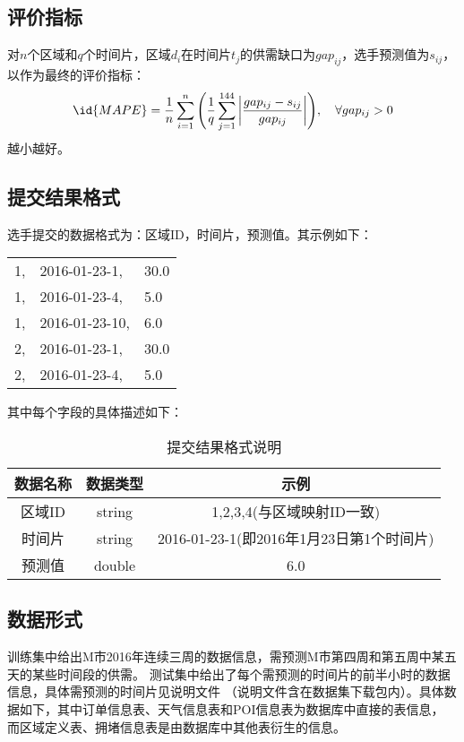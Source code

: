 \documentclass[hyperref,UTF8]{ctexart}
\theoremstyle{definition}
\theoremstyle{remark}
\numberwithin{equation}{subsection}
\begin{document}
	
\subsection{评价指标}
\label{subsec:evaluate_indicator}

	对$n$个区域和$q$个时间片，区域$d_i$在时间片$t_j$的供需缺口为$gap_{ij}$，选手预测值为$s_{ij}$，
以作为最终的评价指标：
\[
	\id{MAPE} = \frac{1}{n} \sum_{i=1}^{n}{\Bigg( \frac{1}{q}\sum_{j=1}^{144}\bigg| \frac{gap_{ij} - s_{ij}}{gap_{ij}} \bigg| \Bigg)},\quad \forall gap_{ij} > 0
\]
越小越好。


\subsection{提交结果格式}
\label{subsec:submit_format}

	选手提交的数据格式为：区域ID，时间片，预测值。其示例如下：\\
	\begin{tabular}{lll}
		1, &2016-01-23-1, &30.0 	\\
		1, &2016-01-23-4, &5.0 		\\
		1, &2016-01-23-10, &6.0 	\\
		2, &2016-01-23-1, &30.0 	\\
		2, &2016-01-23-4, &5.0 	\\
	\end{tabular}
	
	
	其中每个字段的具体描述如下：
	\begin{table}[H]
    \centering
	\caption{提交结果格式说明}
	\begin{tabular}{|c|c|c|}
    \hline
		数据名称	&	数据类型	&	示例							\\
    \hline
		区域ID		&	string		&	1,2,3,4(与区域映射ID一致)		\\
		时间片		&	string		&	2016-01-23-1(即2016年1月23日第1个时间片) \\
		预测值		&	double		&	6.0	\\
    \hline
	\end{tabular}
	\end{table}
	
\subsection{数据形式}
\label{subsec:data_format}

	训练集中给出M市2016年连续三周的数据信息，需预测M市第四周和第五周中某五天的某些时间段的供需。
测试集中给出了每个需预测的时间片的前半小时的数据信息，具体需预测的时间片见说明文件
（说明文件含在数据集下载包内）。具体数据如下，其中订单信息表、天气信息表和POI信息表为数据库中直接的表信息，
而区域定义表、拥堵信息表是由数据库中其他表衍生的信息。
\end{document}
